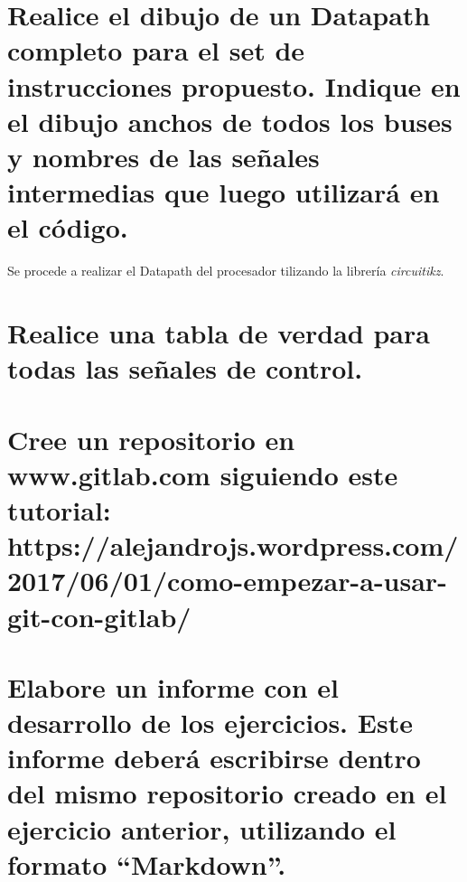 \documentclass[11pt,a4paper]{article}
\begin{document}
\section{Realice el dibujo de un Datapath completo para el set de instrucciones propuesto.
Indique en el dibujo anchos de todos los buses y nombres de las señales
intermedias que luego utilizará en el código.}

Se procede a realizar el Datapath del procesador tilizando la librería \textit{circuitikz}.


\section{Realice una tabla de verdad para todas las señales de control.}

\section{Cree un repositorio en www.gitlab.com siguiendo este tutorial:
\small https://alejandrojs.wordpress.com/2017/06/01/como-empezar-a-usar-git-con-gitlab/}

\section{Elabore un informe con el desarrollo de los ejercicios. Este informe deberá
escribirse dentro del mismo repositorio creado en el ejercicio anterior, utilizando el
formato “Markdown”.}
\end{document}
